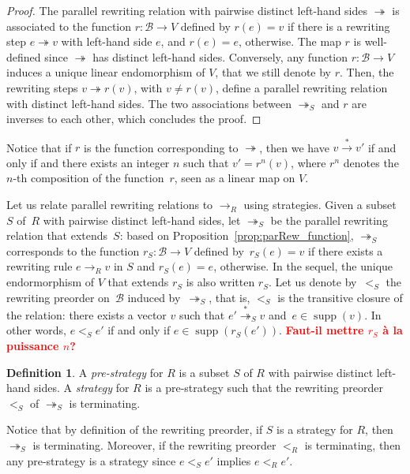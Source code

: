 \documentclass[11pt]{article}
\theoremstyle{definition}
\newtheorem{definition}[theorem]{Definition}
\newcommand\todo[1]{{\bf\textcolor{red}{#1}}}
\newcommand\basis{\mathscr{B}}
\newcommand\ordS{<_S}
\DeclareMathOperator{\supp}{supp}
\newcommand\rewR{\to_R}
\newcommand\parRew{\twoheadrightarrow}
\newcommand\parS{\twoheadrightarrow_S}
\newcommand\transRew{\overset{*}{\to}}
\newcommand\transParS{\overset{*}{\twoheadrightarrow}_S}
\begin{document}
\begin{proof}
  The parallel rewriting relation with pairwise distinct left-hand sides
  $\parRew$ is associated to the function $r:\basis\to V$ defined by
  $r(e)=v$ if there is a rewriting step $e\parRew v$ with left-hand side
  $e$, and $r(e)=e$, otherwise. The map $r$ is well-defined since
  $\parRew$ has distinct left-hand sides. Conversely, any function 
  $r:\basis\to V$ induces a unique linear endomorphism of $V$, that we
  still denote by $r$. Then, the rewriting steps $v\parRew r(v)$, with
  $v\neq r(v)$, define a parallel rewriting relation with distinct
  left-hand sides. The two associations between $\parS$ and $r$ are
  inverses to each other, which concludes the proof. 
\end{proof}

Notice that if $r$ is the function corresponding to $\parRew$, then we
have $v\transRew v'$ if and only if and there exists an integer $n$ such
that $v'=r^n(v)$, where $r^n$ denotes the $n$-th composition of the
function~$r$, seen as a linear map on $V$. 
\medskip

Let us relate parallel rewriting relations to $\rewR$ using strategies.
Given a subset~$S$ of~$R$ with pairwise distinct left-hand sides, let
$\parS$ be the parallel rewriting relation that extends~$S$: based on 
Proposition~\ref{prop:parRew_function}, $\parS$ corresponds to the
function $r_S:\basis\to V$ defined by~$r_S(e)=v$ if there exists a
rewriting rule $e\rewR v$ in $S$ and $r_S(e)=e$, otherwise. In the
sequel, the unique endormorphism of $V$ that extends $r_S$ is also
written $r_S$. Let us denote by~$\ordS$ the rewriting preorder
on~$\basis$ induced by~$\parS$, that is, $\ordS$ is the transitive
closure of the relation: there exists a vector $v$ such that
$e'\transParS v$ and~$e\in\supp(v)$. In other words, $e\ordS e'$ if and
only if $e\in\supp(r_S(e'))$. \todo{Faut-il mettre
  $r_S$ à la puissance $n$?}
\smallskip

\begin{definition}\label{def:strategies}
  A {\em pre-strategy} for $R$ is a subset $S$ of $R$ with pairwise
  distinct left-hand sides. A {\em strategy} for $R$ is a pre-strategy
  such that the rewriting preorder $\ordS$ of $\parS$ is terminating. 
\end{definition}
\smallskip

Notice that by definition of the rewriting preorder, if $S$ is a strategy
for $R$, then $\parS$ is terminating. Moreover, if the rewriting preorder
$<_R$ is terminating, then any pre-strategy is a strategy since
$e\ordS e'$ implies $e<_Re'$.
\smallskip
\end{document}
